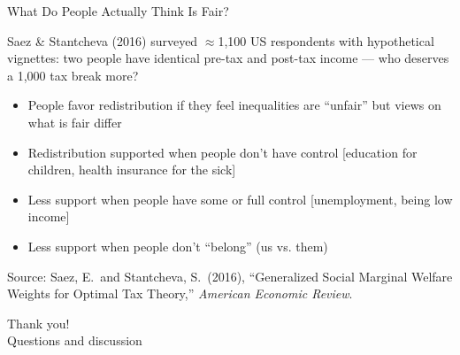 \documentclass[11pt,aspectratio=169]{beamer}
\newcommand{\srcnote}[1]{{\footnotesize\color{wugray}Source: #1}}
\begin{document}
\begin{frame}{What Do People Actually Think Is Fair?}
 
  Saez \& Stantcheva (2016) surveyed \(\approx\)1{,}100 US respondents with hypothetical vignettes: two people have identical pre-tax and post-tax income --- who deserves a \texteuro{}1{,}000 tax break more?
  \begin{itemize}
 \item People favor redistribution if they feel inequalities are “unfair” but views on what is
 fair differ
 \item Redistribution supported when people don’t have control [education for children,
 health insurance for the sick]  
 \item Less support when people have some or full control [unemployment, being low
 income]
  \item Less support when people don’t “belong” (us vs. them)
 \end{itemize} 
  
  \srcnote{Saez, E.\ and Stantcheva, S.\ (2016), ``Generalized Social Marginal Welfare Weights for Optimal Tax Theory,'' \emph{American Economic Review}.}
\end{frame}

 
 



\begin{frame}[standout]
  Thank you!\\
  \vspace{0.5em}
  \small Questions and discussion
\end{frame}
\end{document}

